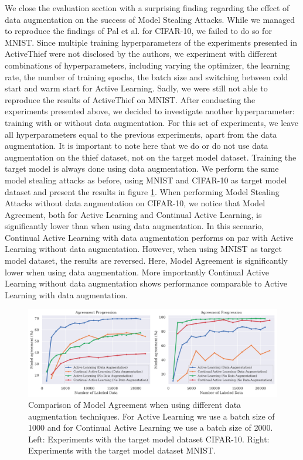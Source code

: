 We close the evaluation section with a surprising finding regarding the effect of data augmentation on the success of Model Stealing Attacks. While
we managed to reproduce the findings of Pal et al. for CIFAR-10, we failed to do so for MNIST. Since multiple training hyperparameters of the experiments
presented in ActiveThief were not disclosed by the authors, we experiment with different combinations of hyperparameters, including varying the optimizer,
the learning rate, the number of training epochs, the batch size and switching between cold start and warm start for Active Learning. Sadly, we were still
not able to reproduce the results of ActiveThief on MNIST. After conducting the experiments presented above, we decided to investigate another hyperparameter:
training with or without data augmentation. For this set of experiments, we leave all hyperparameters equal to the previous experiments, apart from the data
augmentation. It is important to note here that we do or do not use data augmentation on the thief dataset, not on the target model dataset. Training the
target model is always done using data augmentation. We perform the same model stealing attacks as before, using MNIST and CIFAR-10 as target model dataset
and present the results in figure \ref{fig:Evaluation:Results:CAL:EffectAugmentation}. When performing Model Stealing Attacks without data augmentation on
CIFAR-10, we notice that Model Agreement, both for Active Learning and Continual Active Learning, is significantly lower than when using data augmentation.
In this scenario, Continual Active Learning with data augmentation performs on par with Active Learning without data augmentation. However, when using MNIST
as target model dataset, the results are reversed. Here, Model Agreement is significantly lower when using data augmentation. More importantly Continual
Active Learning without data augmentation shows performance comparable to Active Learning with data augmentation. \par

\begin{figure}[h]
    \centering
    \includegraphics[width=\linewidth]{images/results_CALMS/effect_data_augmentation.png}
    \caption[Effect of Data Augmentation on the success of Model Stealing Attacks]{Comparison of Model Agreement when using different data augmentation
    techniques. For Active Learning we use a batch size of 1000 and for Continual Active Learning we use a batch size of 2000. Left: Experiments with
    the target model dataset CIFAR-10. Right: Experiments with the target model dataset MNIST.}
    \label{fig:Evaluation:Results:CAL:EffectAugmentation}
\end{figure}


